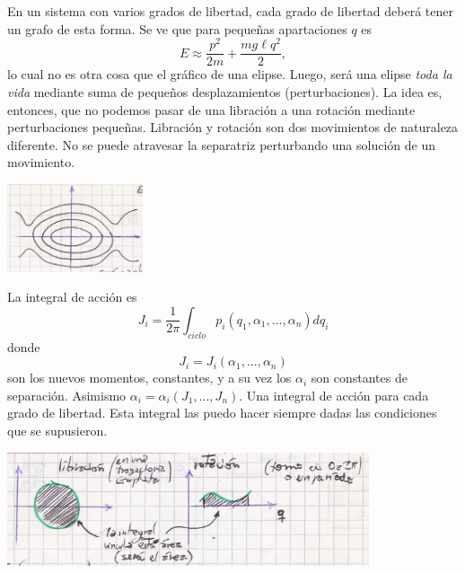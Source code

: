 \documentclass[10pt,oneside]{CBFT_book}
\begin{document}
En un sistema con varios grados de libertad, cada grado de libertad deberá tener un grafo de
esta forma.
Se ve que para pequeñas apartaciones $q$ es
\[
	E \approx \frac{p^2}{2m} + \frac{ m g \ell q^2 }{2},
\]
lo cual no es otra cosa que el gráfico de una elipse. Luego, será una elipse {\it toda la vida} mediante
suma de pequeños desplazamientos (perturbaciones). La idea es, entonces, que no podemos pasar de una
libración a una rotación mediante perturbaciones pequeñas. 
Libración y rotación son dos movimientos de naturaleza diferente.
No se puede atravesar la separatriz perturbando una solución de un movimiento.

\includegraphics[width=0.3\textwidth]{images/fig_mc_pendulo_angacc3.jpg}

La integral de acción es
\[
	J_i = \frac{1}{2\pi}\int_{ciclo} p_i(q_1,\alpha_1,...,\alpha_n) dq_i
\]
donde 
\[
	J_i = J_i(\alpha_1,...,\alpha_n)
\]
son los nuevos momentos, constantes, y a su vez los $\alpha_i$ son constantes de separación.
Asimismo $\alpha_i=\alpha_i(J_1,...,J_n)$. Una integral de acción para cada grado de libertad.
Esta integral las puedo hacer siempre dadas las condiciones que se supusieron.

\includegraphics[width=0.8\textwidth]{images/fig_mc_pendulo_angacc4.jpg}
\end{document}
